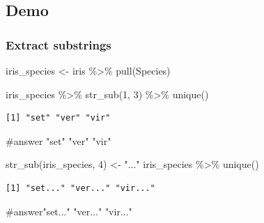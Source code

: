 \documentclass[
  letterpaper,
  DIV=11,
  numbers=noendperiod]{scrartcl}
\newenvironment{Shaded}{\begin{snugshade}}{\end{snugshade}}
\newcommand{\CommentTok}[1]{\textcolor[rgb]{0.37,0.37,0.37}{#1}}
\newcommand{\DecValTok}[1]{\textcolor[rgb]{0.68,0.00,0.00}{#1}}
\newcommand{\FunctionTok}[1]{\textcolor[rgb]{0.28,0.35,0.67}{#1}}
\newcommand{\NormalTok}[1]{\textcolor[rgb]{0.00,0.23,0.31}{#1}}
\newcommand{\OtherTok}[1]{\textcolor[rgb]{0.00,0.23,0.31}{#1}}
\newcommand{\SpecialCharTok}[1]{\textcolor[rgb]{0.37,0.37,0.37}{#1}}
\newcommand{\StringTok}[1]{\textcolor[rgb]{0.13,0.47,0.30}{#1}}
\begin{document}
\subsection{Demo}\label{demo-13}

\subsubsection{Extract substrings}\label{extract-substrings}

\begin{Shaded}
\begin{Highlighting}[]
\NormalTok{iris\_species }\OtherTok{\textless{}{-}}\NormalTok{ iris }\SpecialCharTok{\%\textgreater{}\%}
    \FunctionTok{pull}\NormalTok{(Species)}
\end{Highlighting}
\end{Shaded}

\begin{Shaded}
\begin{Highlighting}[]
\NormalTok{iris\_species }\SpecialCharTok{\%\textgreater{}\%}
    \FunctionTok{str\_sub}\NormalTok{(}\DecValTok{1}\NormalTok{, }\DecValTok{3}\NormalTok{) }\SpecialCharTok{\%\textgreater{}\%}
    \FunctionTok{unique}\NormalTok{()}
\end{Highlighting}
\end{Shaded}

\begin{verbatim}
[1] "set" "ver" "vir"
\end{verbatim}

\begin{Shaded}
\begin{Highlighting}[]
\CommentTok{\#answer "set" "ver" "vir"}
\end{Highlighting}
\end{Shaded}

\begin{Shaded}
\begin{Highlighting}[]
\FunctionTok{str\_sub}\NormalTok{(iris\_species, }\DecValTok{4}\NormalTok{) }\OtherTok{\textless{}{-}} \StringTok{"..."}
\NormalTok{iris\_species }\SpecialCharTok{\%\textgreater{}\%}
    \FunctionTok{unique}\NormalTok{()}
\end{Highlighting}
\end{Shaded}

\begin{verbatim}
[1] "set..." "ver..." "vir..."
\end{verbatim}

\begin{Shaded}
\begin{Highlighting}[]
\CommentTok{\#answer"set..." "ver..." "vir..."}
\end{Highlighting}
\end{Shaded}
\end{document}
